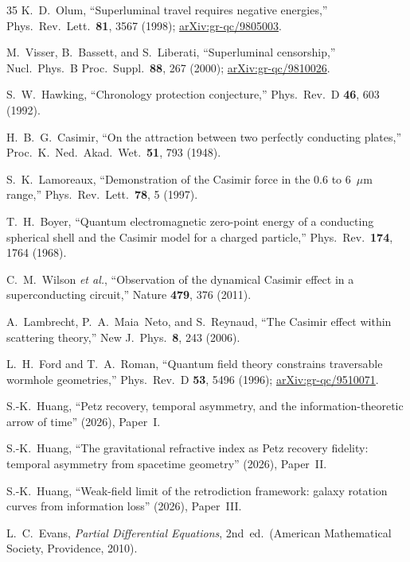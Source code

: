 \documentclass[prd,twocolumn,superscriptaddress,longbibliography]{revtex4-2}
\begin{document}
\begin{thebibliography}{35}
K.~D.~Olum,
``Superluminal travel requires negative energies,''
Phys.\ Rev.\ Lett.\ \textbf{81}, 3567 (1998);
\href{https://arxiv.org/abs/gr-qc/9805003}{arXiv:gr-qc/9805003}.

M.~Visser, B.~Bassett, and S.~Liberati,
``Superluminal censorship,''
Nucl.\ Phys.\ B Proc.\ Suppl.\ \textbf{88}, 267 (2000);
\href{https://arxiv.org/abs/gr-qc/9810026}{arXiv:gr-qc/9810026}.

S.~W.~Hawking,
``Chronology protection conjecture,''
Phys.\ Rev.\ D \textbf{46}, 603 (1992).

H.~B.~G.~Casimir,
``On the attraction between two perfectly conducting plates,''
Proc.\ K.\ Ned.\ Akad.\ Wet.\ \textbf{51}, 793 (1948).

S.~K.~Lamoreaux,
``Demonstration of the Casimir force in the 0.6 to 6~$\mu$m
range,''
Phys.\ Rev.\ Lett.\ \textbf{78}, 5 (1997).

T.~H.~Boyer,
``Quantum electromagnetic zero-point energy of a conducting
spherical shell and the Casimir model for a charged particle,''
Phys.\ Rev.\ \textbf{174}, 1764 (1968).

C.~M.~Wilson \textit{et al.},
``Observation of the dynamical Casimir effect in a
superconducting circuit,''
Nature \textbf{479}, 376 (2011).

A.~Lambrecht, P.~A.~Maia~Neto, and S.~Reynaud,
``The Casimir effect within scattering theory,''
New J.\ Phys.\ \textbf{8}, 243 (2006).

L.~H.~Ford and T.~A.~Roman,
``Quantum field theory constrains traversable wormhole
geometries,''
Phys.\ Rev.\ D \textbf{53}, 5496 (1996);
\href{https://arxiv.org/abs/gr-qc/9510071}{arXiv:gr-qc/9510071}.

S.-K.~Huang,
``Petz recovery, temporal asymmetry, and the
information-theoretic arrow of time''
(2026), Paper~I.

S.-K.~Huang,
``The gravitational refractive index as Petz recovery fidelity:
temporal asymmetry from spacetime geometry''
(2026), Paper~II.

S.-K.~Huang,
``Weak-field limit of the retrodiction framework: galaxy rotation
curves from information loss''
(2026), Paper~III.

L.~C.~Evans,
\emph{Partial Differential Equations},
2nd~ed.\ (American Mathematical Society, Providence, 2010).


\end{thebibliography}
\end{document}

